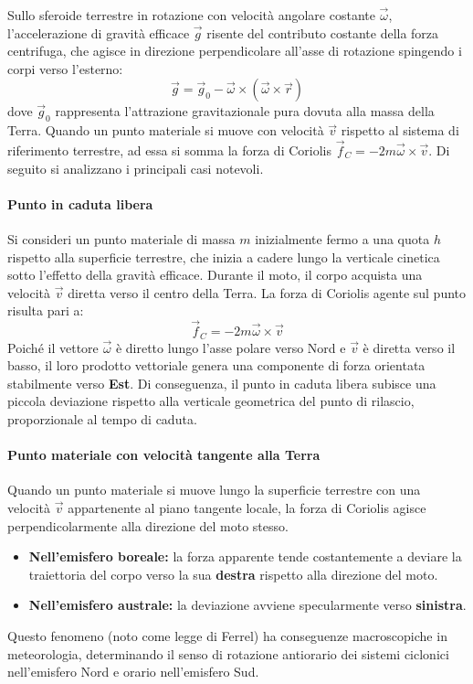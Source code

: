 \documentclass[11pt, a4paper, openright]{book}
\theoremstyle{plain}
\theoremstyle{definition}
\begin{document}
Sullo sferoide terrestre in rotazione con velocità angolare costante $\vec{\omega}$, l'accelerazione di gravità efficace $\vec{g}$ risente del contributo costante della forza centrifuga, che agisce in direzione perpendicolare all'asse di rotazione spingendo i corpi verso l'esterno:
\[ \vec{g} = \vec{g}_0 - \vec{\omega} \times (\vec{\omega} \times \vec{r}) \]
dove $\vec{g}_0$ rappresenta l'attrazione gravitazionale pura dovuta alla massa della Terra. Quando un punto materiale si muove con velocità $\vec{v}$ rispetto al sistema di riferimento terrestre, ad essa si somma la forza di Coriolis $\vec{f}_C = -2m\vec{\omega}\times\vec{v}$. Di seguito si analizzano i principali casi notevoli.

\paragraph{Punto in caduta libera}
Si consideri un punto materiale di massa $m$ inizialmente fermo a una quota $h$ rispetto alla superficie terrestre, che inizia a cadere lungo la verticale cinetica sotto l'effetto della gravità efficace. Durante il moto, il corpo acquista una velocità $\vec{v}$ diretta verso il centro della Terra. La forza di Coriolis agente sul punto risulta pari a:
\[ \vec{f}_C = -2m\vec{\omega} \times \vec{v} \]
Poiché il vettore $\vec{\omega}$ è diretto lungo l'asse polare verso Nord e $\vec{v}$ è diretta verso il basso, il loro prodotto vettoriale genera una componente di forza orientata stabilmente verso \textbf{Est}. Di conseguenza, il punto in caduta libera subisce una piccola deviazione rispetto alla verticale geometrica del punto di rilascio, proporzionale al tempo di caduta.

\paragraph{Punto materiale con velocità tangente alla Terra}
Quando un punto materiale si muove lungo la superficie terrestre con una velocità $\vec{v}$ appartenente al piano tangente locale, la forza di Coriolis agisce perpendicolarmente alla direzione del moto stesso. 
\begin{itemize}
    \item \textbf{Nell'emisfero boreale:} la forza apparente tende costantemente a deviare la traiettoria del corpo verso la sua \textbf{destra} rispetto alla direzione del moto.
    \item \textbf{Nell'emisfero australe:} la deviazione avviene specularmente verso \textbf{sinistra}.
\end{itemize}
Questo fenomeno (noto come legge di Ferrel) ha conseguenze macroscopiche in meteorologia, determinando il senso di rotazione antiorario dei sistemi ciclonici nell'emisfero Nord e orario nell'emisfero Sud.
\end{document}
